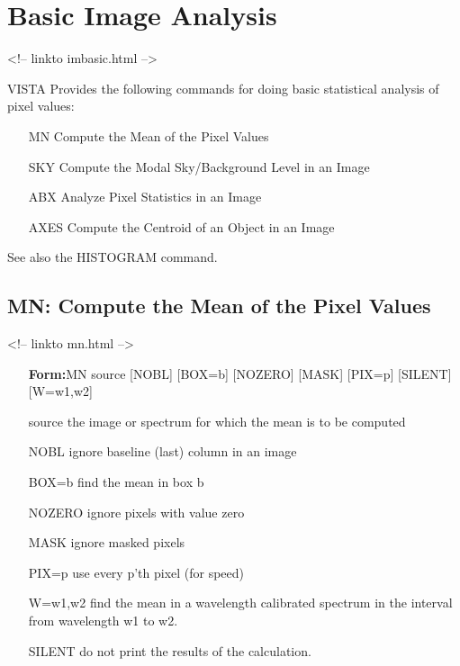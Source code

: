 \chapter{Basic Image Analysis}
\begin{rawhtml}
<!-- linkto imbasic.html -->
\end{rawhtml}

%
%
%

VISTA Provides the following commands for doing basic statistical
analysis of pixel values:
\begin{itemize}
  \item[MN\hfill]{Compute the Mean of the Pixel Values}
  \item[SKY\hfill]{Compute the Modal Sky/Background Level in an Image}
  \item[ABX\hfill]{Analyze Pixel Statistics in an Image}
  \item[AXES\hfill]{Compute the Centroid of an Object in an Image}
\end{itemize}
See also the HISTOGRAM command.

\section{MN: Compute the Mean of the Pixel Values}
\begin{rawhtml}
<!-- linkto mn.html -->
\end{rawhtml}
\begin{itemize}
  \item[\textbf{Form:}MN source {[NOBL]} {[BOX=b]} {[NOZERO]} {[MASK]}
       {[PIX=p]} {[SILENT]} {[W=w1,w2]}\hfill]{}
  \item[source]{the image or spectrum for which the mean
       is to be computed}
  \item[NOBL]{ignore baseline (last) column in an image}
  \item[BOX=b]{find the mean in box b}
  \item[NOZERO]{ignore pixels with value zero}
  \item[MASK]{ignore masked pixels}
  \item[PIX=p]{use every p'th pixel (for speed)}
  \item[W=w1,w2]{find the mean in a wavelength calibrated
       spectrum in the interval from wavelength w1 to w2.}
  \item[SILENT]{do not print the results of the calculation.}
\end{itemize}

